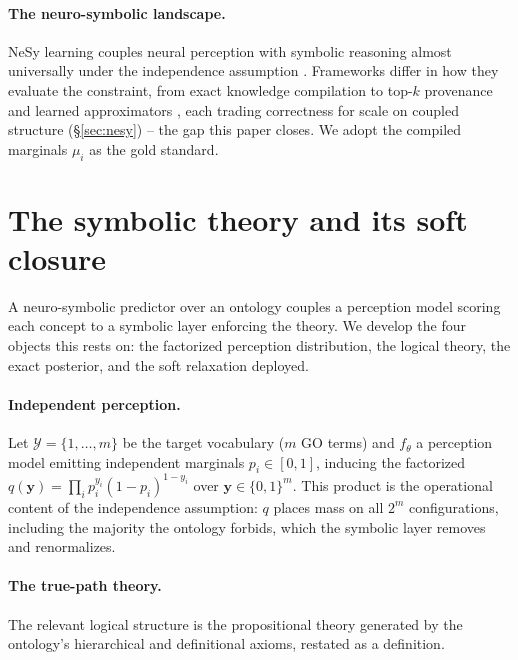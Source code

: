 \documentclass[anon]{nesy2026}
\newcommand{\bC}[1]{\boldsymbol{#1}}
\begin{document}
\paragraph{The neuro-symbolic landscape.}
NeSy learning couples neural perception with symbolic reasoning almost universally under the
independence assumption \citep{deraedt2020survey,vankrieken2024independence}. Frameworks differ in
how they evaluate the constraint, from exact knowledge compilation
\citep{deraedt2007problog,manhaeve2018deepproblog,xu2018semanticloss,ahmed2022spl} to top-$k$
provenance \citep{huang2021scallop,li2023scallop} and learned approximators
\citep{vankrieken2023anesi,vankrieken2025nesydm}, each trading correctness for scale on coupled
structure (\S\ref{sec:nesy}) -- the gap this paper closes. We adopt the compiled marginals $\mu_i$
\citep{xu2018semanticloss,ahmed2022spl} as the gold standard.

\section{The symbolic theory and its soft closure}\label{sec:setup}

A neuro-symbolic predictor over an ontology couples a perception model scoring each concept to a
symbolic layer enforcing the theory. We develop the four objects this rests on: the factorized
perception distribution, the logical theory, the exact posterior, and the soft relaxation deployed.

\paragraph{Independent perception.}
Let $\mathcal{Y}=\{1,\dots,m\}$ be the target vocabulary ($m$ GO terms) and $f_\theta$ a perception
model emitting independent marginals $p_i\in[0,1]$, inducing the factorized
$q(\bC y)=\prod_i p_i^{y_i}(1-p_i)^{1-y_i}$ over $\bC y\in\{0,1\}^m$. This product is the operational
content of the independence assumption: $q$ places mass on all $2^m$ configurations, including the
majority the ontology forbids, which the symbolic layer removes and renormalizes.

\paragraph{The true-path theory.}
The relevant logical structure is the propositional theory generated by the ontology's
hierarchical and definitional axioms, restated as a definition.
\end{document}
